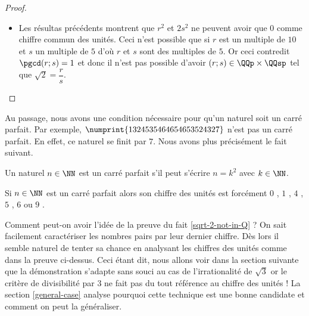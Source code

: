 \begin{proof}
\begin{itemize}[label=\small\textbullet]
		\item Les résultas précédents montrent que $r^2$ et $2 s^2$ ne peuvent avoir que $0$ comme chiffre commun des unités.
		Ceci n'est possible que si $r$ est un multiple de $10$ et $s$ un multiple de $5$ d'où $r$ et $s$ sont des multiples de $5$.
		Or ceci contredit $\pgcd(r ; s) = 1$ 
		et donc il n'est pas possible d'avoir $(r ; s) \in \QQp \times \QQsp$ tel que $\sqrt2 = \dfrac{r}{s}$.
	\end{itemize}
\end{proof}


Au passage, nous avons une condition nécessaire pour qu'un naturel soit un carré parfait. Par exemple, $\numprint{1324535464654653524327}$ n'est pas un carré parfait. En effet, ce naturel se finit par $7$. Nous avons plus précisément le fait suivant.


\begin{fact} \label{perfect-square-last-digit}
	Un naturel $n \in \NN$ est un carré parfait s'il peut s'écrire $n = k^2$ avec $k \in \NN$.
	
	\medskip
	
	Si $n \in \NN$ est un carré parfait alors son chiffre des unités est forcément $0$ , $1$ , $4$ , $5$  , $6$ ou $9$ .
\end{fact}


\begin{remark}
	Comment peut-on avoir l'idée de la preuve du fait \ref{sqrt-2-not-in-Q} ? 
	On sait facilement caractériser les nombres pairs par leur dernier chiffre. Dès lors il semble naturel de tenter sa chance en analysant les chiffres des unités comme dans la preuve ci-dessus.
	Ceci étant dit, nous allons voir dans la section suivante que la démonstration s'adapte sans souci au cas de l'irrationalité de $\sqrt3$ or le critère de divisibilité par $3$ ne fait pas du tout référence au chiffre des unités !
	La section \ref{general-case} analyse pourquoi cette technique est une bonne candidate et comment on peut la généraliser.
\end{remark}


